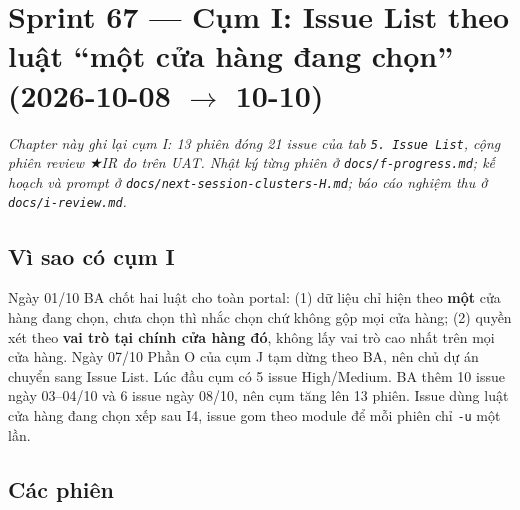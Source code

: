\chapter{Sprint 67 --- Cụm I: Issue List theo luật ``một cửa hàng đang chọn'' (2026-10-08 $\to$ 10-10)}

\emph{Chapter này ghi lại cụm I: 13 phiên đóng 21 issue của tab \texttt{5. Issue List}, cộng phiên review ★IR đo
trên UAT. Nhật ký từng phiên ở \texttt{docs/f-progress.md}; kế hoạch và prompt ở \texttt{docs/next-session-clusters-H.md};
báo cáo nghiệm thu ở \texttt{docs/i-review.md}.}

\section{Vì sao có cụm I}

Ngày 01/10 BA chốt hai luật cho toàn portal: (1) dữ liệu chỉ hiện theo \textbf{một} cửa hàng đang chọn, chưa chọn thì nhắc
chọn chứ không gộp mọi cửa hàng; (2) quyền xét theo \textbf{vai trò tại chính cửa hàng đó}, không lấy vai trò cao nhất trên
mọi cửa hàng. Ngày 07/10 Phần O của cụm J tạm dừng theo BA, nên chủ dự án chuyển sang Issue List. Lúc đầu cụm có 5 issue
High/Medium. BA thêm 10 issue ngày 03--04/10 và 6 issue ngày 08/10, nên cụm tăng lên 13 phiên. Issue dùng luật cửa hàng
đang chọn xếp sau I4, issue gom theo module để mỗi phiên chỉ \texttt{-u} một lần.

\section{Các phiên}

